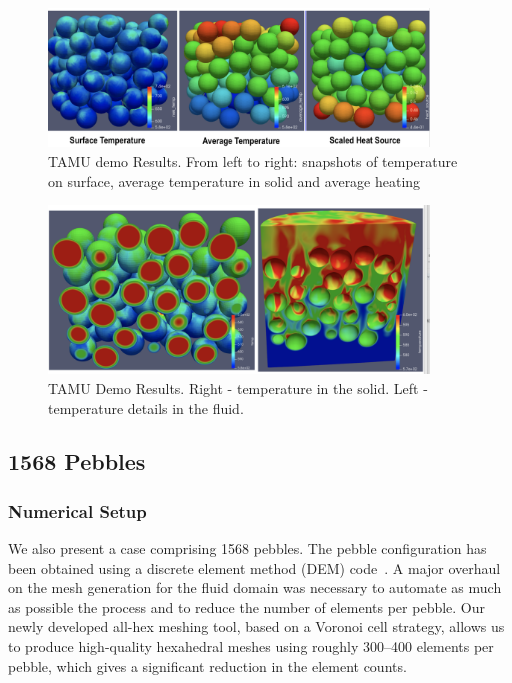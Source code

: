 \begin{figure}[!h]
\centering
\includegraphics[clip=true,width=0.9\textwidth]{Figures/demo_r1}
\caption{TAMU demo Results. From left to right: snapshots of temperature on surface, average temperature in solid and average heating}
\label{f:dtamu1}
\end{figure}

\begin{figure}[!h]
\centering
\includegraphics[clip=true,width=0.9\textwidth]{Figures/demo_r2}
\caption{TAMU Demo Results. Right - temperature in the solid. Left - temperature details in the fluid.}
\label{f:dtamu2}
\end{figure}

\subsection{1568 Pebbles}

\subsubsection{Numerical Setup}

We also present a case comprising 1568 pebbles. The pebble configuration has
been obtained using a discrete element method (DEM) code~\cite{projectChronoWebSite}.
A major overhaul on the mesh generation for the fluid domain was necessary
to automate as much as possible the process and to reduce the number of elements
per pebble. Our newly developed all-hex meshing tool, based on a Voronoi cell strategy,
allows us to produce high-quality hexahedral meshes using roughly 300--400 elements per pebble,
which gives a significant reduction in the element counts.

